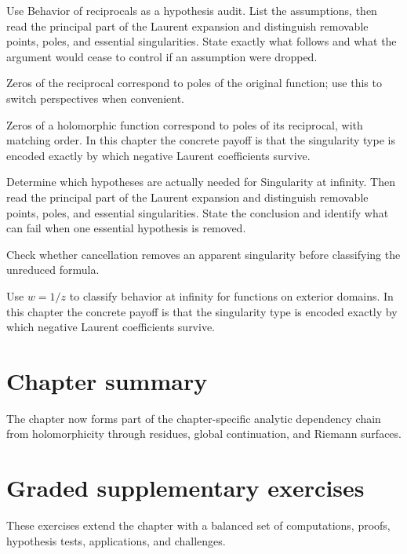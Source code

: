 \begin{exercise}\label{exr:iv09-07}
Use Behavior of reciprocals as a hypothesis audit. List the assumptions, then read the principal part of the Laurent expansion and distinguish removable points, poles, and essential singularities. State exactly what follows and what the argument would cease to control if an assumption were dropped.
\end{exercise}
\begin{hint}
Zeros of the reciprocal correspond to poles of the original function; use this to switch perspectives when convenient.
\end{hint}
\begin{solution}
Zeros of a holomorphic function correspond to poles of its reciprocal, with matching order. In this chapter the concrete payoff is that the singularity type is encoded exactly by which negative Laurent coefficients survive.
\end{solution}

\begin{exercise}\label{exr:iv09-08}
Determine which hypotheses are actually needed for Singularity at infinity. Then read the principal part of the Laurent expansion and distinguish removable points, poles, and essential singularities. State the conclusion and identify what can fail when one essential hypothesis is removed.
\end{exercise}
\begin{hint}
Check whether cancellation removes an apparent singularity before classifying the unreduced formula.
\end{hint}
\begin{solution}
Use $w=1/z$ to classify behavior at infinity for functions on exterior domains. In this chapter the concrete payoff is that the singularity type is encoded exactly by which negative Laurent coefficients survive.
\end{solution}

\section*{Chapter summary}
The chapter now forms part of the chapter-specific analytic dependency chain from holomorphicity through residues, global continuation, and Riemann surfaces.
\section{Graded supplementary exercises}
These exercises extend the chapter with a balanced set of computations, proofs, hypothesis tests, applications, and challenges.

